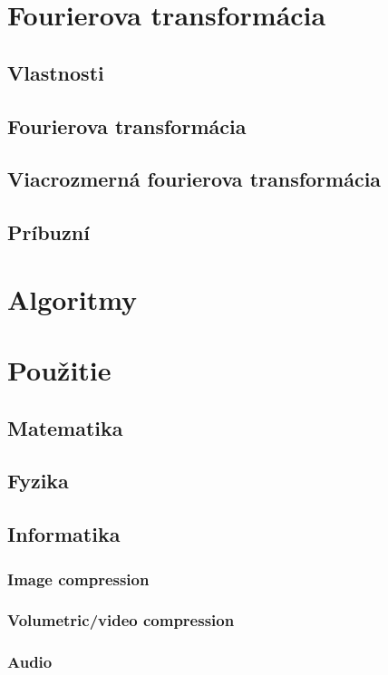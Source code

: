 



\chapter{Fourierova transformácia}
    
    
    
\section{Vlastnosti}
\section{Fourierova transformácia}
\section{Viacrozmerná fourierova transformácia}
\section{Príbuzní}

\chapter{Algoritmy}
    
    
    
    
    
    
    
    
    
    

\chapter{Použitie}
\section{Matematika}
    
    
    
    
    
         
\section{Fyzika}
    
    
    
    
    
\section{Informatika}
    
    
    \subsection{Image compression}
    \subsection{Volumetric/video compression}
    \subsection{Audio}
     
    
